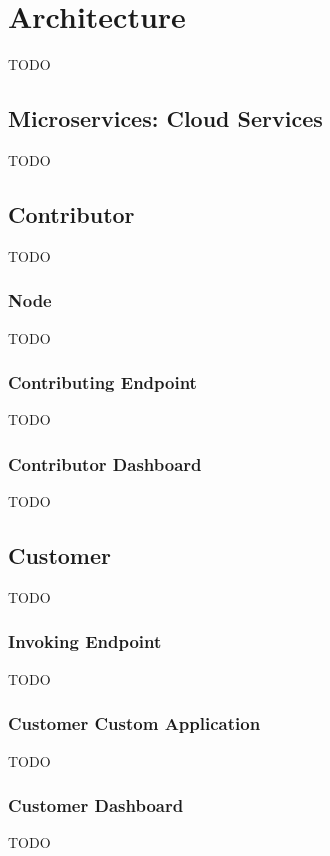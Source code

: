 \section{Architecture}
TODO

\subsection{Microservices: Cloud Services}
TODO

\subsection{Contributor}
TODO

\subsubsection{Node}
TODO

\subsubsection{Contributing Endpoint}
TODO

\subsubsection{Contributor Dashboard}
TODO

\subsection{Customer}
TODO

\subsubsection{Invoking Endpoint}
TODO

\subsubsection{Customer Custom Application}
TODO

\subsubsection{Customer Dashboard}
TODO
